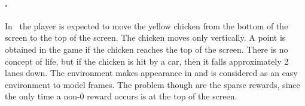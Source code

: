 \paragraph{\freeway.} In \freeway\ the player is expected to move the yellow chicken from the bottom of the screen to the top of the screen.  The chicken moves only vertically. A point is obtained in the game if the chicken reaches the top of the screen. There is no concept of life, but if the chicken is hit by a car, then it falls approximately 2 lanes down. The environment makes appearance in \cite{recurrent} and is considered as an easy environment to model \cite[page 18]{recurrent} frames. The problem though are the sparse rewards, since the only time a non-0 reward occurs is at the top of the screen.   %

